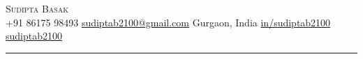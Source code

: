 \documentclass[letterpaper,10pt]{article}
\begin{document}
\begin{center}
    {\Huge \scshape Sudipta Basak} \\ \vspace{3pt}
    \small
    \faPhone* \; +91 86175 98493 \quad
    \faEnvelope[regular] \; \href{mailto:sudiptab2100@gmail.com}{sudiptab2100@gmail.com} \quad
    \faMapMarker* \; Gurgaon, India \quad
    \faLinkedin \; \href{https://linkedin.com/in/sudiptab2100}{in/sudiptab2100} \quad
    \faGithub \; \href{https://github.com/sudiptab2100}{sudiptab2100}
\end{center}
\vspace{-2pt}
{\color{accent}\rule{\textwidth}{1.1pt}}
\vspace{4pt}

\setlength{\columnsep}{22pt}
\end{document}
